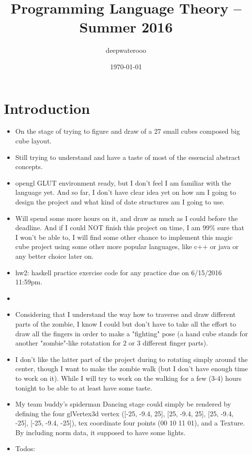 \documentclass[9pt,b5paper]{article}
\author{deepwaterooo}
\date{\today}
\title{Programming Language Theory -- Summer 2016}
\begin{document}
\maketitle
\tableofcontents


\section{Introduction}
\label{sec-1}
\begin{itemize}
\item On the stage of trying to figure and draw of a 27 small cubes composed big cube layout.
\item Still trying to understand and have a taste of most of the essencial abstract concepts.
\item opengl GLUT environment ready, but I don't feel I am familiar with the language yet. And so far, I don't have clear idea yet on how am I going to design the project and what kind of date structures am I going to use.
\item Will spend some more hours on it, and draw as much as I could before the deadline. And if I could NOT finish this project on time, I am 99\% sure that I won't be able to, I will find some other chance to implement this magic cube project using some other more popular languages, like c++ or java or any better choice later on.
\item hw2: haskell practice exercise code for any practice due on 6/15/2016 11:59pm.
\item 
\item Considering that I understand the way how to traverse and draw different parts of the zombie, I know I could but don't have to take all the effort to draw all the fingers in order to make a "fighting" pose (a hand cube stands for another "zombie"-like rotatation for 2 or 3 different finger parts).
\item I don't like the latter part of the project during to rotating simply around the center, though I want to make the zombie walk (but I don't have enough time to work on it). While I will try to work on the walking for a few (3-4) hours tonight to be able to at least have some taste.
\item My team buddy's spiderman Dancing stage could simply be rendered by defining the four glVertex3d vertex ([-25, -9.4, 25], [25, -9.4, 25], [25, -9.4, -25], [-25, -9.4, -25]), tex coordinate four points (00 10 11 01), and a Texture. By including norm data, it supposed to have some lights.
\item Todos: 

\end{itemize}
\end{document}
